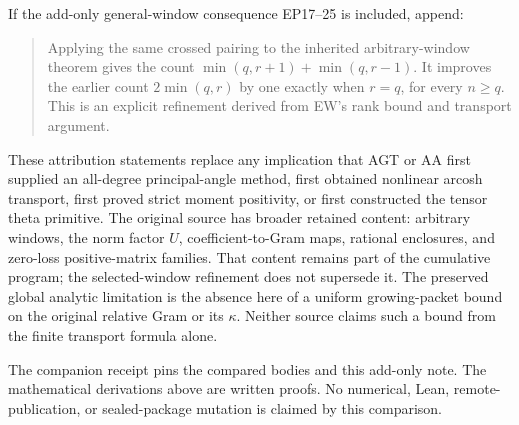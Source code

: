 If the add-only general-window consequence EP17--25 is included, append:

\begin{quote}
Applying the same crossed pairing to the inherited arbitrary-window theorem gives the count \(\min(q,r+1)+\min(q,r-1)\). It improves the earlier count \(2\min(q,r)\) by one exactly when \(r=q\), for every \(n\ge q\). This is an explicit refinement derived from EW's rank bound and transport argument.
\end{quote}

These attribution statements replace any implication that AGT or AA first supplied an all-degree principal-angle method, first obtained nonlinear arcosh transport, first proved strict moment positivity, or first constructed the tensor theta primitive. The original source has broader retained content: arbitrary windows, the norm factor \(U\), coefficient-to-Gram maps, rational enclosures, and zero-loss positive-matrix families. That content remains part of the cumulative program; the selected-window refinement does not supersede it. The preserved global analytic limitation is the absence here of a uniform growing-packet bound on the original relative Gram or its \(\kappa\). Neither source claims such a bound from the finite transport formula alone.

The companion receipt pins the compared bodies and this add-only note. The mathematical derivations above are written proofs. No numerical, Lean, remote-publication, or sealed-package mutation is claimed by this comparison.
